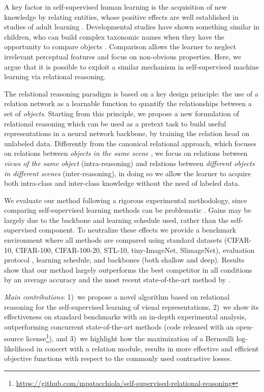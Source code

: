 \documentclass{article}
\begin{document}
A key factor in self-supervised human learning is the acquisition of new knowledge by relating entities, whose positive effects are well established in studies of adult learning \citep{gentner2005relational, goldwater2018relational}. Developmental studies have shown something similar in children, who can build complex taxonomic names when they have the opportunity to compare objects \citep{gentner1999comparison, namy2002making}. Comparison allows the learner to neglect irrelevant perceptual features and focus on non-obvious properties. Here, we argue that it is possible to exploit a similar mechanism in self-supervised machine learning via relational reasoning.

The relational reasoning paradigm is based on a key design principle: the use of a relation network as a learnable function to quantify the relationships between a set of \emph{objects}.
Starting from this principle, we propose a new formulation of relational reasoning which can be used as a pretext task to build useful representations in a neural network backbone, by training the relation head on unlabeled data.
Differently from the canonical relational approach, which focuses on relations between \emph{objects in the same scene} \citep{santoro2017simple}, we focus on relations between \emph{views of the same object} (intra-reasoning) and relations between \emph{different objects in different scenes} (inter-reasoning), in doing so we allow the learner to acquire both intra-class and inter-class knowledge without the need of labeled data.

We evaluate our method following a rigorous experimental methodology, since comparing self-supervised learning methods can be problematic \citep{kolesnikov2019revisiting, musgrave2020metric}. Gains may be largely due to the backbone and learning schedule used, rather than the self-supervised component. To neutralize these effects we provide a benchmark environment where all methods are compared using standard datasets (CIFAR-10, CIFAR-100, CIFAR-100-20, STL-10, tiny-ImageNet, SlimageNet), evaluation protocol \citep{kolesnikov2019revisiting}, learning schedule, and backbones (both shallow and deep). Results show that our method largely outperforms the best competitor in all conditions by an average  accuracy and the most recent state-of-the-art method by .

\emph{Main contributions}: 1)~we propose a novel algorithm based on relational reasoning for the self-supervised learning of visual representations, 2)~we show its effectiveness on standard benchmarks with an in-depth experimental analysis, outperforming concurrent state-of-the-art methods (code released with an open-source license\footnote{\url{https://github.com/mpatacchiola/self-supervised-relational-reasoning}}), and 3)~we highlight how the maximization of a Bernoulli log-likelihood in concert with a relation module, results in more effective and efficient objective functions with respect to the commonly used contrastive losses.
\end{document}
